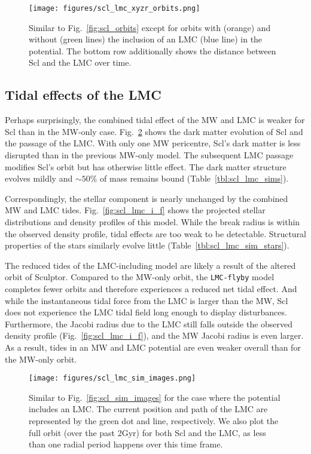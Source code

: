 \begin{figure}
\centering
\texttt{[image: figures/scl\_lmc\_xyzr\_orbits.png]}
\caption[Sculptor orbits with LMC]{Similar to Fig.~\ref{fig:scl_orbits}
except for orbits with (orange) and without (green lines) the inclusion
of an LMC (blue line) in the potential. The bottom row additionally
shows the distance between Scl and the LMC over
time.}\label{fig:scl_lmc_orbits_effect}
\end{figure}

\subsection{Tidal effects of the LMC}\label{tidal-effects-of-the-lmc}

Perhaps surprisingly, the combined tidal effect of the MW and LMC is
weaker for Scl than in the MW-only case.
Fig.~\ref{fig:scl_lmc_sim_images} shows the dark matter evolution of Scl
and the passage of the LMC. With only one MW pericentre, Scl's dark
matter is less disrupted than in the previous MW-only model. The
subsequent LMC passage modifies Scl's orbit but has otherwise little
effect. The dark matter structure evolves mildly and \(\sim 50\%\) of
mass remains bound (Table~\ref{tbl:scl_lmc_sims}).

Correspondingly, the stellar component is nearly unchanged by the
combined MW and LMC tides. Fig.~\ref{fig:scl_lmc_i_f} shows the
projected stellar distributions and density profiles of this model.
While the break radius is within the observed density profile, tidal
effects are too weak to be detectable. Structural properties of the
stars similarly evolve little (Table~\ref{tbl:scl_lmc_sim_stars}).

The reduced tides of the LMC-including model are likely a result of the
altered orbit of Sculptor. Compared to the MW-only \smallperi{} orbit,
the \texttt{LMC-flyby} model completes fewer orbits and therefore
experiences a reduced net tidal effect. And while the instantaneous
tidal force from the LMC is larger than the MW, Scl does not experience
the LMC tidal field long enough to display disturbances. Furthermore,
the Jacobi radius due to the LMC still falls outside the observed
density profile (Fig.~\ref{fig:scl_lmc_i_f}), and the MW Jacobi radius
is even larger. As a result, tides in an MW and LMC potential are even
weaker overall than for the MW-only orbit.

\begin{figure}
\centering
\texttt{[image: figures/scl\_lmc\_sim\_images.png]}
\caption[Sculptor simulation snapshots with LMC]{Similar to
Fig.~\ref{fig:scl_sim_images} for the case where the potential includes
an LMC. The current position and path of the LMC are represented by the
green dot and line, respectively. We also plot the full orbit (over the
past 2Gyr) for both Scl and the LMC, as less than one radial period
happens over this time frame.}\label{fig:scl_lmc_sim_images}
\end{figure}

